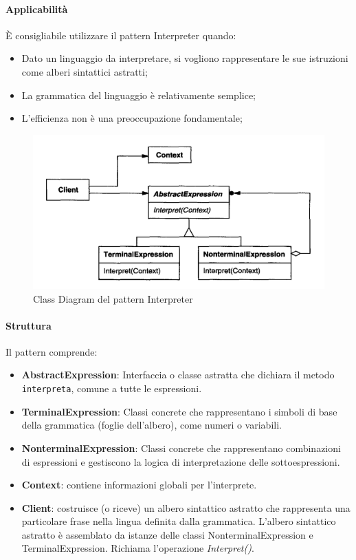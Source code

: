 \newpage

\paragraph{Applicabilità} È consigliabile utilizzare il pattern Interpreter quando:
\begin{itemize}
    \item Dato un linguaggio da interpretare, si vogliono rappresentare le sue istruzioni come alberi sintattici astratti;
    \item La grammatica del linguaggio è relativamente semplice;
    \item L'efficienza non è una preoccupazione fondamentale;
\end{itemize}

\begin{figure}[H]
    \centering
    \includegraphics[width=0.75\linewidth]{assets/pattern/interpreter/interpreter-struttura.png}
    \caption{Class Diagram del pattern Interpreter}
\end{figure}

\paragraph{Struttura} Il pattern comprende:
\begin{itemize}
    \item \textbf{AbstractExpression}: Interfaccia o classe astratta che dichiara il metodo \texttt{interpreta}, comune a tutte le espressioni.
    \item \textbf{TerminalExpression}: Classi concrete che rappresentano i simboli di base della grammatica (foglie dell'albero), come numeri o variabili.
    \item \textbf{NonterminalExpression}: Classi concrete che rappresentano combinazioni di espressioni e gestiscono la logica di interpretazione delle sottoespressioni.
    \item \textbf{Context}: contiene informazioni globali per l'interprete.
    \item \textbf{Client}: costruisce (o riceve) un albero sintattico astratto che rappresenta una particolare frase nella lingua definita dalla grammatica. L'albero sintattico astratto è assemblato da istanze delle classi NonterminalExpression e TerminalExpression. Richiama l'operazione \textit{Interpret()}.
\end{itemize}


